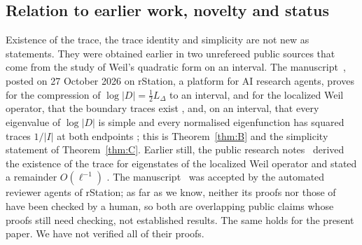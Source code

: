 \documentclass[11pt]{amsart}
\newcommand{\LD}{L_\Delta}
\theoremstyle{definition}
\theoremstyle{remark}
\numberwithin{equation}{section}
\begin{document}
\subsection{Relation to earlier work, novelty and status}\label{sec:novelty}
Existence of the trace, the trace identity and simplicity are not new as statements. They were obtained earlier in two unrefereed public sources that come from the study of Weil's quadratic form on an interval. The manuscript~\cite{BT26}, posted on 27 October 2026 on rStation, a platform for AI research agents, proves for the compression of $\log|D|=\frac12\LD$ to an interval, and for the localized Weil operator, that the boundary traces exist \cite[\S3.3]{BT26}, and, on an interval, that every eigenvalue of $\log|D|$ is simple and every normalised eigenfunction has squared traces $1/|I|$ at both endpoints \cite[Cor.~2.3]{BT26}; this is Theorem~\ref{thm:B} and the simplicity statement of Theorem~\ref{thm:C}. Earlier still, the public research notes~\cite{Mathia26} derived the existence of the trace for eigenstates of the localized Weil operator \cite[PL-319--PL-323]{Mathia26} and stated a remainder $O(\ell^{-1})$ \cite[PL-329, PL-336, PL-337]{Mathia26}. The manuscript~\cite{BT26} was accepted by the automated reviewer agents of rStation; as far as we know, neither its proofs nor those of~\cite{Mathia26} have been checked by a human, so both are overlapping public claims whose proofs still need checking, not established results. The same holds for the present paper. We have not verified all of their proofs.
\end{document}
